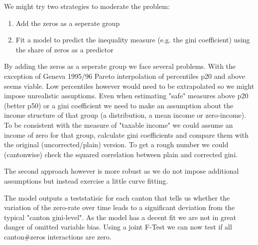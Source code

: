 We might try two strategies to moderate the problem:

\begin{enumerate}
\item Add the zeros as a seperate group
\item Fit a model to predict the inequality measure (e.g. the gini coefficient) using the share of zeros as a predictor
\end{enumerate}

By adding the zeros as a seperate group we face several problems. With the exception of Geneva 1995/96 Pareto interpolation of percentiles p20 and above seems viable. Low percentiles however would need to be extrapolated so we might impose unrealistic assuptioms. Even when estimating "safe" measures above p20 (better p50) or a gini coefficient we need to make an assumption about the income structure of that group (a distribution, a mean income or zero-income). To be consistent with the measure of "taxable income" we could assume an income of zero for that group, calculate gini coefficients and compare them with the original (uncorrected/plain) version. To get a rough number we could (cantonwise) check the squared correlation between plain and corrected gini.

The second approach however is more robust as we do not impose additional assumptions but instead exercise a little curve fitting.

\begin{knitrout}
\color{fgcolor}\begin{kframe}
\begin{alltt}
 \hlkwb{<-}  \hlopt{~}  \hlopt{+} \hlopt{:} \hlopt{+}  \hlopt{+} \hlopt{:}
     
\end{alltt}


{\ttfamily\noindent\bfseries\color{errorcolor}{\#\# Error: 'data' argument is of the wrong type}}\begin{alltt}
\end{alltt}


{\ttfamily\noindent\bfseries\color{errorcolor}{\#\# Error: Objekt 'fit' nicht gefunden}}\end{kframe}
\end{knitrout}


The model outputs a teststatisic for each canton that tells us whether the variation of the zero-rate over time leads to a significant deviation from the typical "canton gini-level". As the model has a decent fit we are not in great danger of omitted variable bias. Using a joint F-Test we can now test if all canton#zeros interactions are zero. 

